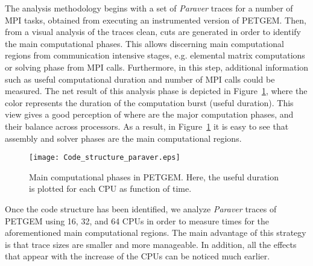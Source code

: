 \documentclass[review]{elsarticle}
\begin{document}
The analysis methodology begins with a set of \textit{Paraver} traces for a number of MPI tasks, obtained from executing an instrumented version of PETGEM. Then, from a visual analysis of the traces clean, cuts are generated in order to identify the main computational phases. This allows discerning main computational regions from communication intensive stages, e.g. elemental matrix computations or solving phase from MPI calls. Furthermore, in this step, additional information such as useful computational duration and number of MPI calls could be measured. The net result of this analysis phase is depicted in Figure~\ref{fig:Code_structure_paraver}, where the color represents the duration of the computation burst (useful duration). This view gives a good perception of where are the major computation phases, and their balance across processors. As a result, in Figure~\ref{fig:Code_structure_paraver} it is easy to see that assembly and solver phases are the main computational regions.
\begin{figure}[htbp!]
\centering
\texttt{[image: Code\_structure\_paraver.eps]}
\caption{Main computational phases in PETGEM. Here, the useful duration is plotted for each CPU as function of time.}
\label{fig:Code_structure_paraver}
\end{figure}
Once the code structure has been identified, we analyze \textit{Paraver} traces of PETGEM using 16, 32, and 64 CPUs in order to measure times for the aforementioned main computational regions. The main advantage of this strategy is that trace sizes are smaller and more manageable. In addition, all the effects that appear with the increase of the CPUs can be noticed much earlier.
\end{document}
